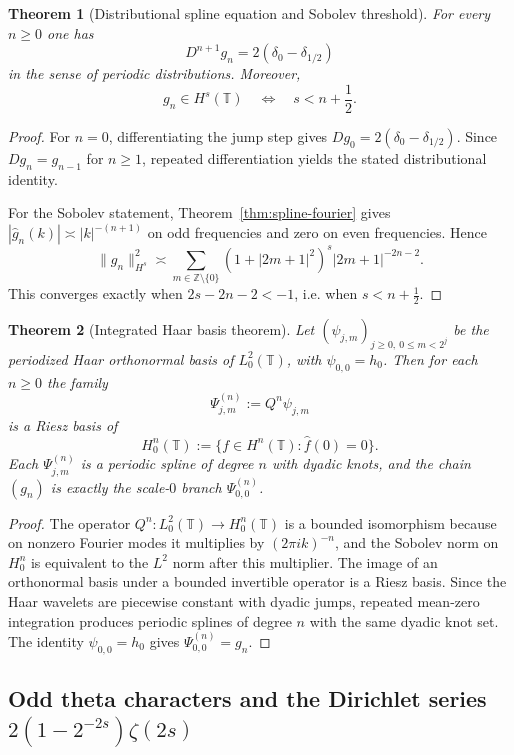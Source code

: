\documentclass[11pt,a4paper]{article}
\numberwithin{equation}{section}
\newtheorem{theorem}{Theorem}[section]
\theoremstyle{definition}
\theoremstyle{remark}
\newcommand{\ZZ}{\mathbb Z}
\begin{document}
\begin{theorem}[Distributional spline equation and Sobolev threshold]\label{thm:spline-regularity}
For every $n\ge 0$ one has
\[
D^{n+1}g_n=2(\delta_0-\delta_{1/2})
\]
in the sense of periodic distributions.  Moreover,
\[
g_n\in H^s(\mathbb T)
\quad\Longleftrightarrow\quad
s<n+\frac12.
\]
\end{theorem}

\begin{proof}
For $n=0$, differentiating the jump step gives $Dg_0=2(\delta_0-\delta_{1/2})$.  Since $Dg_n=g_{n-1}$ for $n\ge 1$, repeated differentiation yields the stated distributional identity.

For the Sobolev statement, Theorem~\ref{thm:spline-fourier} gives $|\widehat g_n(k)|\asymp |k|^{-(n+1)}$ on odd frequencies and zero on even frequencies.  Hence
\[
\|g_n\|_{H^s}^2\asymp \sum_{m\in\ZZ\setminus\{0\}} (1+|2m+1|^2)^s |2m+1|^{-2n-2}.
\]
This converges exactly when $2s-2n-2<-1$, i.e. when $s<n+\tfrac12$.
\end{proof}

\begin{theorem}[Integrated Haar basis theorem]\label{thm:integrated-haar}
Let $(\psi_{j,m})_{j\ge 0,\ 0\le m<2^j}$ be the periodized Haar orthonormal basis of $L^2_0(\mathbb T)$, with $\psi_{0,0}=h_0$.  Then for each $n\ge 0$ the family
\[
\Psi^{(n)}_{j,m}:=Q^n\psi_{j,m}
\]
is a Riesz basis of
\[
H^n_0(\mathbb T):=\{f\in H^n(\mathbb T):\widehat f(0)=0\}.
\]
Each $\Psi^{(n)}_{j,m}$ is a periodic spline of degree $n$ with dyadic knots, and the chain $(g_n)$ is exactly the scale-$0$ branch $\Psi^{(n)}_{0,0}$.
\end{theorem}

\begin{proof}
The operator $Q^n:L^2_0(\mathbb T)\to H^n_0(\mathbb T)$ is a bounded isomorphism because on nonzero Fourier modes it multiplies by $(2\pi i k)^{-n}$, and the Sobolev norm on $H^n_0$ is equivalent to the $L^2$ norm after this multiplier.  The image of an orthonormal basis under a bounded invertible operator is a Riesz basis.  Since the Haar wavelets are piecewise constant with dyadic jumps, repeated mean-zero integration produces periodic splines of degree $n$ with the same dyadic knot set.  The identity $\psi_{0,0}=h_0$ gives $\Psi^{(n)}_{0,0}=g_n$.
\end{proof}

\subsection{Odd theta characters and the Dirichlet series $2(1-2^{-2s})\zeta(2s)$}
\end{document}
